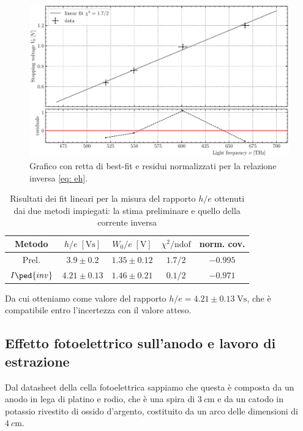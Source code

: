 \documentclass[10pt, a4paper, italian]{article}
\begin{document}
\begin{figure}[htbp]
    \centering
	\includegraphics[width=\textwidth]{heprel}
    \caption{Grafico con retta di best-fit e residui normalizzati per la
    relazione inversa \cref{eq: eh}.
    \label{fig: eh}}
\end{figure}

\begin{table}
\centering
\begin{tabular}{ccccc}
\toprule
Metodo & $h/e \; [\si{\V \s}]$ & $W_0/e \; [\si{\V}]$ &
$\chi^2/\text{ndof}$ & norm. cov. \\
\midrule
Prel. & $3.9 \pm 0.2$ & $1.35 \pm 0.12$ & $1.7/2$ & $-0.995$ \\
$I\ped{inv}$ & $4.21 \pm 0.13$ & $1.46 \pm 0.21$ & $0.1/2$ & $-0.971$ \\
\bottomrule
\end{tabular}
\caption{Risultati dei fit lineari per la misura del rapporto $h/e$ ottenuti
dai due metodi impiegati: la stima preliminare e quello della corrente inversa
\label{tab: he}}
\end{table}

Da cui otteniamo come valore del rapporto $h/e = 4.21 \pm 0.13 \; \si{\V \s}$,
che è compatibile entro l'incertezza con il valore atteso.


\subsection{Effetto fotoelettrico sull'anodo e lavoro di estrazione}
Dal datasheet della cella fotoelettrica sappiamo che questa è composta da un
anodo in lega di platino e rodio, che è una spira di $\SI{3}{c\meter}$ e da un
catodo in potassio rivestito di ossido d'argento, costituito da un arco
delle dimensioni di $\SI{4}{c\meter}$.
\end{document}
